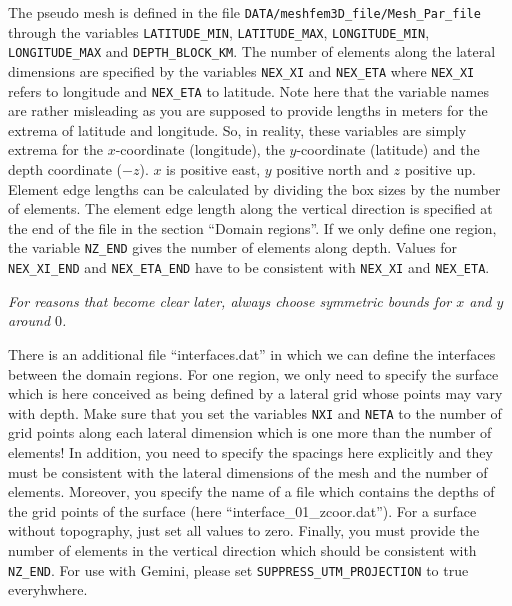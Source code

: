 The pseudo mesh is defined in the file \verb+DATA/meshfem3D_file/Mesh_Par_file+ through the variables \verb+LATITUDE_MIN+, \verb+LATITUDE_MAX+, \verb+LONGITUDE_MIN+, \verb+LONGITUDE_MAX+ and \verb+DEPTH_BLOCK_KM+. The number of elements along the lateral dimensions are specified by the variables \verb+NEX_XI+ and \verb+NEX_ETA+ where \verb+NEX_XI+ refers to longitude and \verb+NEX_ETA+ to latitude. Note here that the variable names are rather misleading as you are supposed to provide lengths in meters for the extrema of latitude and longitude. So, in reality, these variables are simply extrema for the $x$-coordinate (longitude), the $y$-coordinate (latitude) and the depth coordinate ($-z$). $x$ is positive east, $y$ positive north and $z$ positive up. Element edge lengths can be calculated by dividing the box sizes by the number of elements. The element edge length along the vertical direction is specified at the end of the file in the section ``Domain regions''. If we only define one region, the variable \verb+NZ_END+ gives the number of elements along depth. Values for \verb+NEX_XI_END+ and \verb+NEX_ETA_END+ have to be consistent with \verb+NEX_XI+ and \verb+NEX_ETA+.

\emph{For reasons that become clear later, always choose symmetric bounds for $x$ and $y$ around $0$.}

There is an additional file ``interfaces.dat'' in which we can define the interfaces between the domain regions. For one region, we only need to specify the surface which is here conceived as being defined by a lateral grid whose points may vary with depth. Make sure that you set the variables \verb+NXI+ and \verb+NETA+ to the number of grid points along each lateral dimension which is one more than the number of elements! In addition, you need to specify the spacings here explicitly and they must be consistent with the lateral dimensions of the mesh and the number of elements. Moreover, you specify the name of a file which contains the depths of the grid points of the surface (here ``interface\_01\_zcoor.dat''). For a surface without topography, just set all values to zero. Finally, you must provide the number of elements in the vertical direction which should be consistent with \verb+NZ_END+. For use with Gemini, please set \verb+SUPPRESS_UTM_PROJECTION+ to true everyhwhere.

